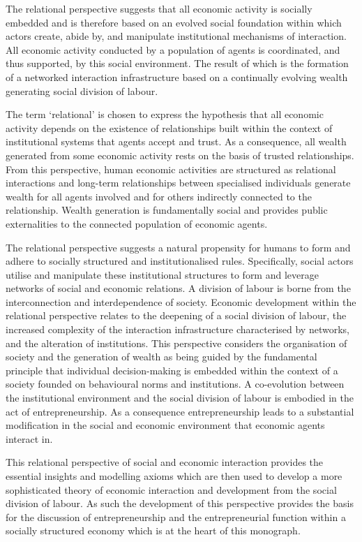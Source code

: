 The relational perspective suggests that all economic activity is socially embedded and is therefore based on an evolved social foundation within which actors create, abide by, and manipulate institutional mechanisms of interaction. All economic activity conducted by a population of agents is coordinated, and thus supported, by this social environment. The result of which is the formation of a networked interaction infrastructure based on a continually evolving wealth generating social division of labour.

The term `relational' is chosen to express the hypothesis that all economic activity depends on the existence of relationships built within the context of institutional systems that agents accept and trust. As a consequence, all wealth generated from some economic activity rests on the basis of trusted relationships. From this perspective, human economic activities are structured as relational interactions and long-term relationships between specialised individuals generate wealth for all agents involved and for others indirectly connected to the relationship. Wealth generation is fundamentally social and provides public externalities to the connected population of economic agents.

The relational perspective suggests a natural propensity for humans to form and adhere to socially structured and institutionalised rules. Specifically, social actors utilise and manipulate these institutional structures to form and leverage networks of social and economic relations. A division of labour is borne from the interconnection and interdependence of society. Economic development within the relational perspective relates to the deepening of a social division of labour, the increased complexity of the interaction infrastructure characterised by networks, and the alteration of institutions. This perspective considers the organisation of society and the generation of wealth as being guided by the fundamental principle that individual decision-making is embedded within the context of a society founded on behavioural norms and institutions. A co-evolution between the institutional environment and the social division of labour is embodied in the act of entrepreneurship. As a consequence entrepreneurship leads to a substantial modification in the social and economic environment that economic agents interact in.

This relational perspective of social and economic interaction provides the essential insights and modelling axioms which are then used to develop a more sophisticated theory of economic interaction and development from the social division of labour. As such the development of this perspective provides the basis for the discussion of entrepreneurship and the entrepreneurial function within a socially structured economy which is at the heart of this monograph.

